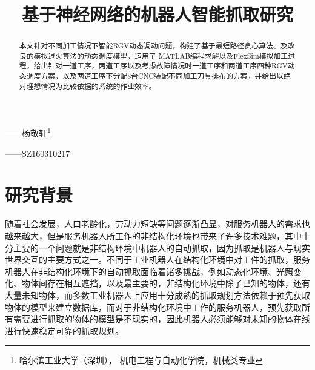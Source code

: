 \documentclass[no-math,bwprint]{YangThesis}
\title{基于神经网络的机器人智能抓取研究}
\begin{document}
 \maketitle

 \setcounter{page}{1}
 
 \vspace{0.5cm}
 \hfill{——杨敬轩\footnote{\small 哈尔滨工业大学（深圳），
 机电工程与自动化学院，机械类专业}}\par
 \hfill{——SZ160310217}
 
 \begin{abstract}
 
本文针对不同加工情况下智能RGV动态调动问题，构建了基于最短路径贪心算法、及改良的模拟退火算法的动态调度模型，运用了 MATLAB编程求解以及FlexSim模拟加工过程，给出针对一道工序，两道工序以及考虑故障情况时一道工序和两道工序四种RGV动态调度方案，以及两道工序下分配8台CNC装配不同加工刀具排布的方案，并给出以绝对理想情况为比较依据的系统的作业效率。

\end{abstract}

\vspace{-1.3cm}
\tableofcontents

\clearpage
\vspace{-1cm}
\section{研究背景}

\setcounter{page}{1}

随着社会发展，人口老龄化，劳动力短缺等问题逐渐凸显，对服务机器人的需求也越来越大，但是服务机器人所工作的非结构化环境也带来了许多技术难题，其中十分主要的一个问题就是非结构环境中机器人的自动抓取，因为抓取是机器人与现实世界交互的主要方式之一。不同于工业机器人在结构化环境中对工件的抓取，服务机器人在非结构化环境下的自动抓取面临着诸多挑战，例如动态化环境、光照变化、物体间存在相互遮挡，以及最主要的，非结构化环境中除了已知的物体，还有大量未知物体，而多数工业机器人上应用十分成熟的抓取规划方法依赖于预先获取物体的模型来建立数据库，而对于非结构化环境中工作的服务机器人，预先获取所有需要进行抓取的物体的模型是不现实的，因此机器人必须能够对未知的物体在线进行快速稳定可靠的抓取规划。
\end{document}
